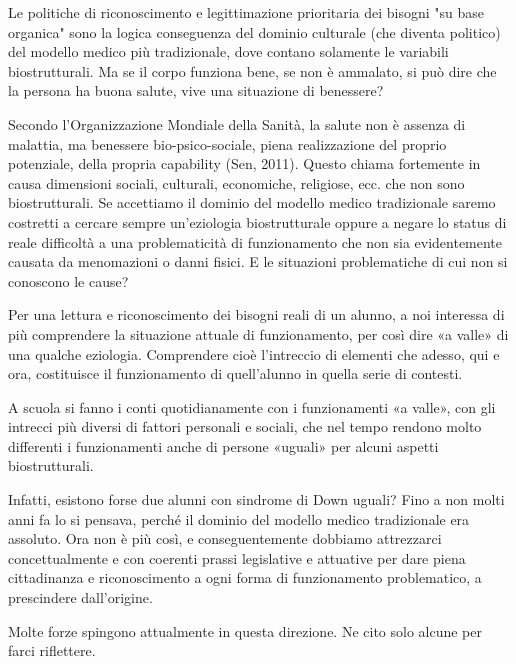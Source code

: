 Le politiche di riconoscimento e legittimazione prioritaria dei bisogni "su base organica" sono
la logica conseguenza del dominio culturale (che diventa politico) del modello medico più
tradizionale, dove contano solamente le variabili biostrutturali. Ma se il corpo funziona bene, se
non è ammalato, si può dire che la persona ha buona salute, vive una situazione di benessere?

Secondo l'Organizzazione Mondiale della Sanità, la salute non è assenza di malattia, ma
benessere bio-psico-sociale, piena realizzazione del proprio potenziale, della propria capability
(Sen, 2011). Questo chiama fortemente in causa dimensioni sociali, culturali, economiche,
religiose, ecc. che non sono biostrutturali. Se accettiamo il dominio del modello medico
tradizionale saremo costretti a cercare sempre un'eziologia biostrutturale oppure a negare lo
status di reale difficoltà a una problematicità di funzionamento che non sia evidentemente causata
da menomazioni o danni fisici. E le situazioni problematiche di cui non si conoscono le cause?

Per una lettura e riconoscimento dei bisogni reali di un alunno, a noi interessa di più
comprendere la situazione attuale di funzionamento, per così dire «a valle» di una qualche
eziologia. Comprendere cioè l'intreccio di elementi che adesso, qui e ora, costituisce il
funzionamento di quell'alunno in quella serie di contesti.

A scuola si fanno i conti quotidianamente con i funzionamenti «a valle», con gli intrecci più
diversi di fattori personali e sociali, che nel tempo rendono molto differenti i funzionamenti anche
di persone «uguali» per alcuni aspetti biostrutturali.

Infatti, esistono forse due alunni con sindrome di Down uguali? Fino a non molti anni fa lo si
pensava, perché il dominio del modello medico tradizionale era assoluto. Ora non è più così, e
conseguentemente dobbiamo attrezzarci concettualmente e con coerenti prassi legislative e
attuative per dare piena cittadinanza e riconoscimento a ogni forma di funzionamento
problematico, a prescindere dall'origine.

Molte forze spingono attualmente in questa direzione. Ne cito solo alcune per farci riflettere.


